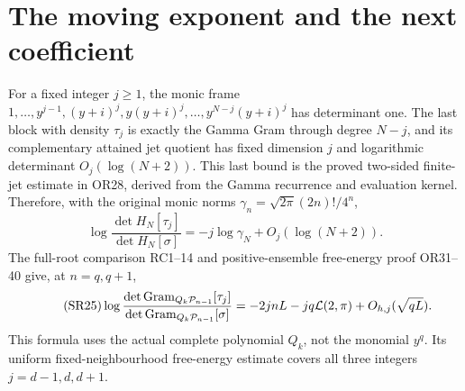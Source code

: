\section{The moving exponent and the next coefficient}
For a fixed integer $j\ge1$, the monic frame
$1,\ldots,y^{j-1},(y+i)^j,y(y+i)^j,\ldots,y^{N-j}(y+i)^j$
has determinant one. The last block with density $\tau_j$ is exactly the
Gamma Gram through degree $N-j$, and its complementary attained jet quotient
has fixed dimension $j$ and logarithmic determinant $O_j(\log(N+2))$.
This last bound is the proved two-sided finite-jet estimate in OR28, derived
from the Gamma recurrence and evaluation kernel. Therefore, with the original
monic norms $\gamma_n=\sqrt{2\pi}(2n)!/4^n$,
\begin{equation}\tag{SR24}
 \log\frac{\det H_N[\tau_j]}{\det H_N[\sigma]}
 =-j\log\gamma_N+O_j(\log(N+2)).
\end{equation}
The full-root comparison RC1--14 and positive-ensemble free-energy proof OR31--40
give, at $n=q,q+1$,
\begin{equation}\tag{SR25}
 \log\frac{\det\operatorname{Gram}_{Q_k\mathcal P_{n-1}}[\tau_j]}
 {\det\operatorname{Gram}_{Q_k\mathcal P_{n-1}}[\sigma]}
 =-2jnL-jq\mathcal L(2,\pi)+O_{h,j}(\sqrt{qL}).
\end{equation}
This formula uses the actual complete polynomial $Q_k$, not the monomial
$y^q$. Its uniform fixed-neighbourhood free-energy estimate covers all three
integers $j=d-1,d,d+1$.

